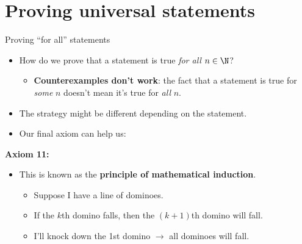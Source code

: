 \documentclass[11pt,aspectratio=1610,handout]{beamer}
\begin{document}
\section{Proving universal statements}
	\begin{frame}{Proving ``for all'' statements}
		\begin{itemize}
			\item How do we prove that a statement is true \emph{for all} $n \in \N$?  \p
			\begin{itemize}
				\item \textbf{Counterexamples don't work}: the fact that a statement is true for \emph{some} $n$ doesn't mean it's true for \emph{all} $n$.  \p
			\end{itemize}
			\item The strategy might be different depending on the statement. 
			\item Our final axiom can help us:  \p
		\end{itemize}
		\textbf{Axiom 11:} 
		\p
		\begin{itemize}
			\item This is known as the \textbf{principle of mathematical induction}. \p
			\begin{itemize}
				\item Suppose I have a line of dominoes.  \p
				\item If the $k$th domino falls, then the $(k+1)$th domino will fall.  \p
				\item I'll knock down the 1st domino $\rightarrow$ all dominoes will fall. 
			\end{itemize}
		\end{itemize}
	\end{frame}
	
	
	
\end{document}
